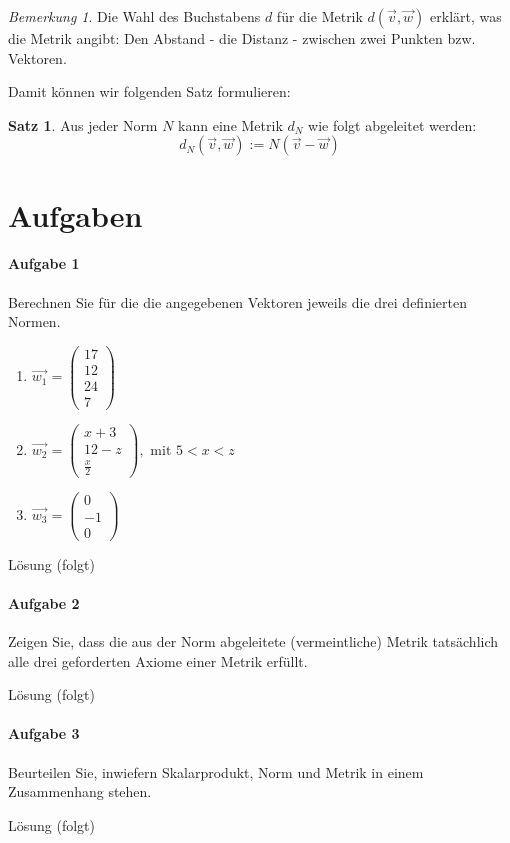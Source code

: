 \documentclass[11pt,a4paper]{scrartcl}
\theoremstyle{remark}
\newtheorem{note}{Bemerkung}
\theoremstyle{definition}
\newtheorem{satz}{Satz}[section]
\begin{document}
\begin{note}
Die Wahl des Buchstabens $d$ für die Metrik $d(\vec{v}, \vec{w})$ erklärt, was die Metrik angibt: Den Abstand - die Distanz - zwischen zwei Punkten bzw. Vektoren.
\end{note}
Damit können wir folgenden Satz formulieren:
\begin{satz}
Aus jeder Norm $N$ kann eine Metrik $d_N$ wie folgt abgeleitet werden:
\[d_N (\vec{v}, \vec{w}) := N(\vec{v} - \vec{w})\]
\end{satz}
\pagebreak
\section*{Aufgaben}
\paragraph{Aufgabe 1} Berechnen Sie für die die angegebenen Vektoren jeweils die drei definierten Normen.
\begin{enumerate}
\item $\vec{w_1} = \left( \begin{matrix} 17 \\ 12 \\ 24 \\ 7\end{matrix} \right)$
\item $\vec{w_2} = \left( \begin{matrix} x+3 \\ 12-z \\ \frac{x}{2} \end{matrix} \right), \text{ mit } 5 < x < z$
\item $\vec{w_3} = \left( \begin{matrix} 0 \\ -1 \\ 0 \end{matrix} \right)$
\end{enumerate}
\begin{flushright}
Lösung (folgt)
\end{flushright}
\paragraph{Aufgabe 2} Zeigen Sie, dass die aus der Norm abgeleitete (vermeintliche) Metrik tatsächlich alle drei geforderten Axiome einer Metrik erfüllt.
\begin{flushright}
Lösung (folgt)
\end{flushright}
\paragraph{Aufgabe 3} Beurteilen Sie, inwiefern Skalarprodukt, Norm und Metrik in einem Zusammenhang stehen.
\begin{flushright}
Lösung (folgt)
\end{flushright}
\pagebreak
\end{document}
